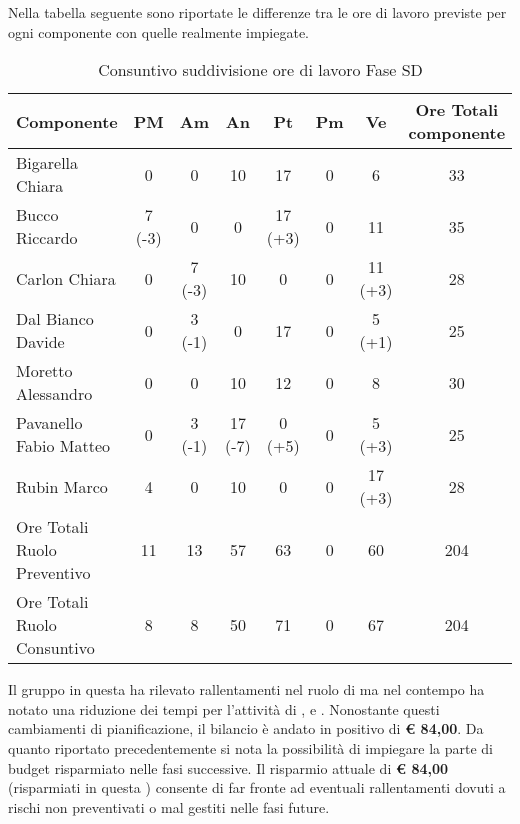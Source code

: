 			Nella tabella seguente sono riportate le differenze tra le ore di lavoro previste per ogni componente con quelle realmente impiegate.
			\begin{table}[H]
				\begin{center}
					\begin{tabular}{| l | c | c | c | c | c | c | c |}
						\hline
						Componente 					& PM	& Am	 & An 		& Pt 		& Pm 	& Ve 	& Ore Totali componente \\ \hline
						
						Bigarella Chiara 			& 0		& 0		& 10 		& 17 		& 0		& 6 		& 33 \\
						Bucco Riccardo 				& 7 (-3)& 0		& 0			& 17 (+3) 	& 0		& 11 		& 35 \\
						Carlon Chiara	 			& 0		& 7 (-3)& 10 		& 0			& 0		& 11 (+3)	& 28 \\
						Dal Bianco Davide 			& 0		& 3 (-1)& 0			& 17 		& 0		& 5	(+1)	& 25 \\
						Moretto Alessandro 			& 0		& 0 	& 10 		& 12 		& 0		& 8 		& 30 \\
						Pavanello Fabio Matteo	 	& 0		& 3 (-1)& 17 (-7)	& 0	(+5)	& 0		& 5	(+3)	& 25 \\
						Rubin Marco					& 4 	& 0		& 10 		& 0			& 0		& 17 (+3)	& 28 \\ \hline \hline
						
						Ore Totali Ruolo Preventivo	& 11 	& 13 	& 57 		& 63 		& 0		& 60		& 204\\ 
						Ore Totali Ruolo Consuntivo	& 8 	& 8 	& 50 		& 71 		& 0		& 67		& 204\\ \hline
					\end{tabular}
				\end{center}
				\caption{Consuntivo suddivisione ore di lavoro Fase SD}
			\end{table}
			Il gruppo \groupname{} in questa  ha rilevato rallentamenti nel ruolo di  ma nel contempo ha notato una riduzione dei tempi per l'attività di ,  e . Nonostante questi cambiamenti di pianificazione, il bilancio è andato in positivo di \textbf{\euro{} 84,00}.
			Da quanto riportato precedentemente si nota la possibilità di impiegare la parte di budget risparmiato nelle fasi successive. Il risparmio attuale di \textbf{\euro{} 84,00} (risparmiati in questa ) consente di far fronte ad eventuali rallentamenti dovuti a rischi non preventivati o mal gestiti nelle fasi future.

